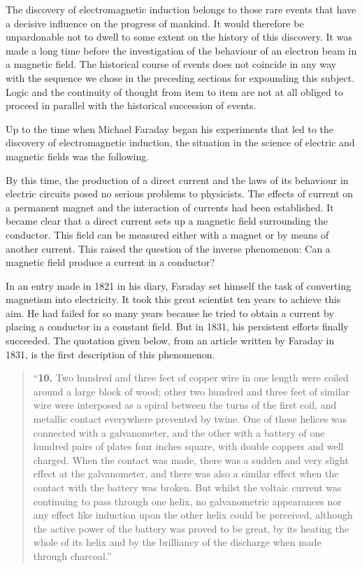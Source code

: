 The discovery of electromagnetic induction belongs to those rare events that have a decisive influence on the progress of mankind. It would therefore be unpardonable not to dwell to some extent on the history of this discovery. It was made a long time before the investigation of the behaviour of an electron beam in a
magnetic field. The historical course of events does not coincide in any way with the sequence we chose in the preceding sections for expounding this subject. Logic and the continuity of thought from item to item are not at all obliged to proceed in parallel with the historical succession of events.

Up to the time when Michael Faraday began his experiments that led to the discovery of electromagnetic induction, the situation in the science of electric and magnetic fields was the following.

By this time, the production of a direct current and the laws of its behaviour in electric circuits posed no serious problems to physicists. The effects of current
on a permanent magnet and the interaction of currents had been established. It became clear that a direct current sets up a magnetic field surrounding the conductor. This field can be measured either with a magnet or by means of another current. This raised the question of the inverse phenomenon: Can a magnetic field produce a current in a conductor?

In an entry made in 1821 in his diary, Faraday set himself the task of converting magnetism into electricity. It took this great scientist ten years to achieve this aim. He had failed for so many years because he tried to obtain a current by placing a conductor in a constant field. But in 1831, his persistent efforts finally succeeded. The quotation given below, from an article written by Faraday in 1831, is the first description of this phenomenon.

\begin{quote}
``\textbf{10.} { Two hundred and three feet of copper wire in one length were coiled around a large block of wood; other two hundred and three feet of similar wire were interposed as a spiral between the turns of the first coil, and metallic contact everywhere prevented by twine. One of these helices was connected with a galvanometer, and the other with a battery of one hundred pairs of plates four inches square, with double coppers and well charged. When the contact was made, there was a sudden and very slight effect at the galvanometer, and there was also a similar effect when the contact with the battery was broken. But whilst the voltaic current was continuing to pass through one helix, no galvanometric appearances nor any effect like induction upon the other helix could be perceived, although the active power of the battery was proved to be great, by its heating the whole of its helix and by the brilliancy of the discharge when made through charcoal.}''
\end{quote}

